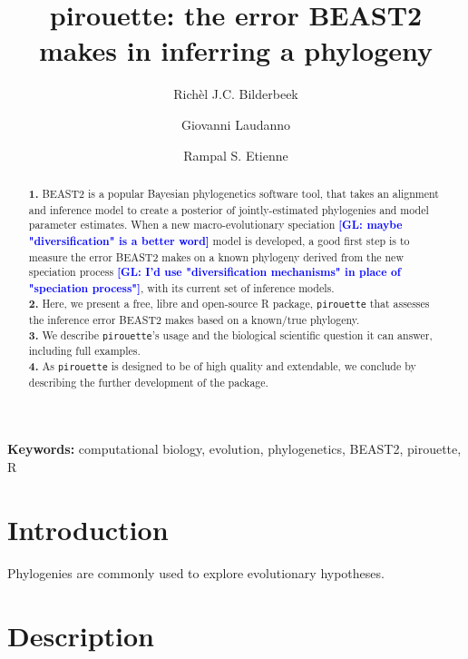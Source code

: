 \documentclass{article}
\title{pirouette: the error BEAST2 makes in inferring a phylogeny}
\author[1]{Rich\`el J.C. Bilderbeek}
\author[1]{Giovanni Laudanno}
\author[1]{Rampal S. Etienne}
\affil[1]{Groningen Institute for Evolutionary Life Sciences, University of Groningen, Groningen, The Netherlands}
\newcommand{\giovanni}[1]{\textcolor{blue}{\textbf{[GL: #1]}}}
\begin{document}
\maketitle

\begin{abstract}

  \textbf{1. }
    BEAST2 is a popular Bayesian phylogenetics software tool,
    that takes an alignment and inference model to create a
    posterior of jointly-estimated phylogenies and model parameter estimates.
    When a new macro-evolutionary speciation \giovanni{maybe "diversification" is a better word} model is developed,
    a good first step is to measure the error BEAST2 makes on a known
    phylogeny derived from the new speciation process \giovanni{I'd use "diversification mechanisms" in place of "speciation process"}, 
    with its current set of inference models. \\
  \textbf{2. }
    Here, we present a free, libre and open-source R package, \verb;pirouette;
    that assesses the inference error BEAST2 makes based on a known/true 
    phylogeny. \\
  \textbf{3. }
    We describe \verb;pirouette;'s usage and the biological scientific
    question it can answer, including full examples. \\
  \textbf{4. }
    As \verb;pirouette; is designed to be of high quality and extendable, 
    we conclude by describing the further development of the package. \\
\end{abstract}

{\bf Keywords:} computational biology, evolution, phylogenetics, BEAST2, pirouette, R





\section{Introduction}

Phylogenies are commonly used to explore evolutionary hypotheses.

\section{Description}
\end{document}
